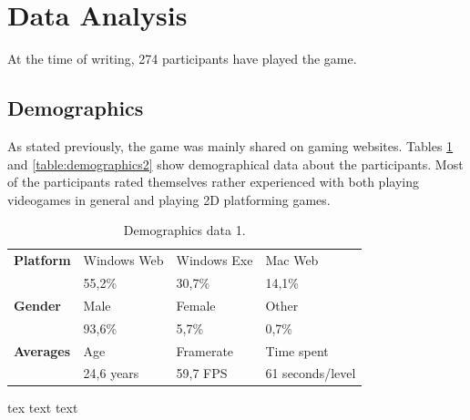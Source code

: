 \section{Data Analysis} \label{data}
At the time of writing, 274 participants have played the game.

\subsection{Demographics}
As stated previously, the game was mainly shared on gaming websites. Tables \ref{table:demographics1} and \ref{table:demographics2} show demographical data about the participants. Most of the participants rated themselves rather experienced with both playing videogames in general and playing 2D platforming games.


\begin{table}[htbp]
\scriptsize
\centering
\begin{tabular}{|l|l|l|l|}
\hline
\textbf{Platform} & Windows Web & Windows Exe & Mac Web \\
                  & 55,2\%      & 30,7\%      & 14,1\%  \\
\hline
\textbf{Gender}   & Male        & Female      & Other   \\
                  & 93,6\%      & 5,7\%       & 0,7\%   \\
\hline
\textbf{Averages}      & Age     & Framerate            & Time spent        \\
                  & 24,6 years  & 59,7 FPS           & 61 seconds/level        \\
\hline
\end{tabular}
\caption{Demographics data 1.}
\label{table:demographics1}
\end{table}


tex text text



